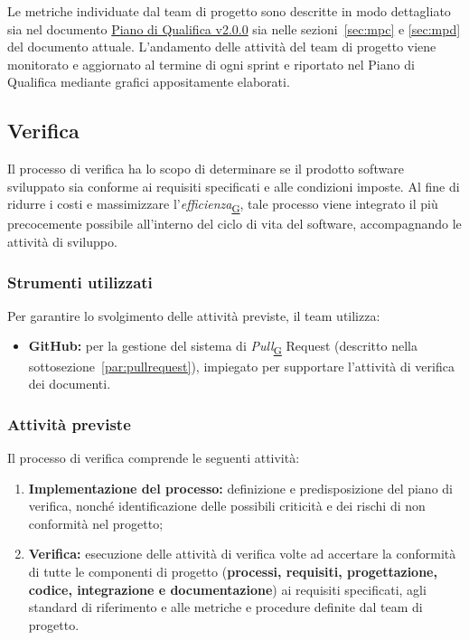 \documentclass[a4paper,12pt]{article}
\begin{document}
        Le metriche individuate dal team di progetto sono descritte in modo dettagliato sia nel documento \href{https://atlasteam9.github.io/Atlas/docs/PB/documenti/esterni/Piano%20di%20Qualifica.pdf}{Piano di Qualifica v2.0.0} sia nelle sezioni~\ref{sec:mpc} e \ref{sec:mpd} del documento attuale.
        L'andamento delle attività del team di progetto viene monitorato e aggiornato al termine di ogni sprint e riportato nel Piano di Qualifica mediante grafici appositamente elaborati.
    

    \subsection{Verifica}
        Il processo di verifica ha lo scopo di determinare se il prodotto software sviluppato sia conforme ai requisiti specificati e alle condizioni imposte. Al fine di ridurre i costi e massimizzare l'\textit{efficienza}\textsubscript{\href{https://atlasteam9.github.io/Atlas/glossario.html\#Efficienza}{G}}, tale processo viene integrato il più precocemente possibile all'interno del ciclo di vita del software, accompagnando le attività di sviluppo.

        \subsubsection{Strumenti utilizzati}
            Per garantire lo svolgimento delle attività previste, il team utilizza:
            \begin{itemize}
                \item \textbf{GitHub:} per la gestione del sistema di \textit{Pull}\textsubscript{\href{https://atlasteam9.github.io/Atlas/glossario.html\#Pull}{G}} Request (descritto nella sottosezione~\ref{par:pullrequest}), impiegato per supportare l'attività di verifica dei documenti.
            \end{itemize}    
        

        \subsubsection{Attività previste}
        \label{subsubsec:attVer}
            Il processo di verifica comprende le seguenti attività:
            \begin{enumerate}
                \item \textbf{Implementazione del processo:} definizione e predisposizione del piano di verifica, nonché identificazione delle possibili criticità e dei rischi di non conformità nel progetto;
                \item \textbf{Verifica:} esecuzione delle attività di verifica volte ad accertare la conformità di tutte le componenti di progetto (\textbf{processi, requisiti, progettazione, codice, integrazione e documentazione}) ai requisiti specificati, agli standard di riferimento e alle metriche e procedure definite dal team di progetto.
            \end{enumerate}    
        
\end{document}

